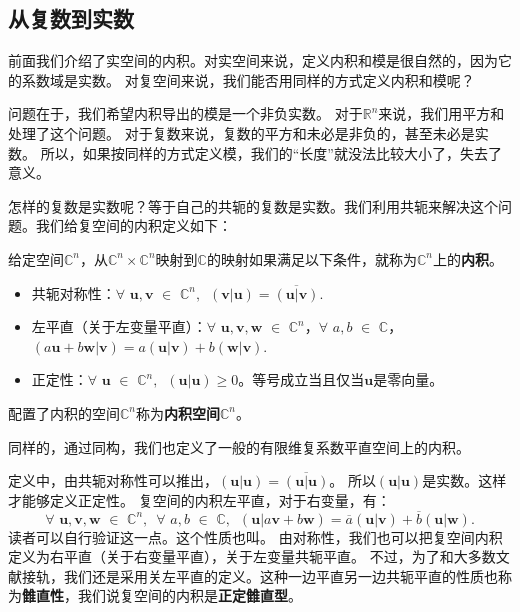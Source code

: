 \documentclass[12pt,UTF8,fontset=none]{ctexbook}
\begin{document}
\subsection{从复数到实数}
前面我们介绍了实空间的内积。对实空间来说，定义内积和模是很自然的，因为它的系数域是实数。
对复空间来说，我们能否用同样的方式定义内积和模呢？

问题在于，我们希望内积导出的模是一个非负实数。
对于$\mathbb{R}^n$来说，我们用平方和处理了这个问题。
对于复数来说，复数的平方和未必是非负的，甚至未必是实数。
所以，如果按同样的方式定义模，我们的“长度”就没法比较大小了，失去了意义。

怎样的复数是实数呢？等于自己的共轭的复数是实数。我们利用共轭来解决这个问题。我们给复空间的内积定义如下：
\begin{df}\label{df:7_3}
    给定空间$\mathbb{C}^n$，从$\mathbb{C}^n \times \mathbb{C}^n$映射到$\mathbb{C}$的映射如果满足以下条件，就称为$\mathbb{C}^n$上的\textbf{内积}。
    \begin{itemize}
        \item 共轭对称性：$\forall \,\, \mathbf{u}, \mathbf{v} \,\, \in \,\, \mathbb{C}^n, \,\,\, (\mathbf{v}|\mathbf{u}) = \overline{(\mathbf{u}|\mathbf{v})}.$
        \item 左平直（关于左变量平直）：$\forall \,\, \mathbf{u}, \mathbf{v}, \mathbf{w} \,\, \in \,\, \mathbb{C}^n$，$\forall \,\,a, b \,\, \in \,\, \mathbb{C}$，$ (a\mathbf{u}+b\mathbf{w}|\mathbf{v}) = a(\mathbf{u}|\mathbf{v}) + b(\mathbf{w}|\mathbf{v}).$
        \item 正定性：$\forall \,\, \mathbf{u} \,\, \in \,\, \mathbb{C}^n, \,\,\, (\mathbf{u}|\mathbf{u}) \geqslant 0$。等号成立当且仅当$\mathbf{u}$是零向量。
    \end{itemize}
    
    配置了内积的空间$\mathbb{C}^n$称为\textbf{内积空间}$\mathbb{C}^n$。
\end{df}
同样的，通过同构，我们也定义了一般的有限维复系数平直空间上的内积。

定义中，由共轭对称性可以推出，$(\mathbf{u}|\mathbf{u}) = \overline{(\mathbf{u}|\mathbf{u})}$。
所以$(\mathbf{u}|\mathbf{u})$是实数。这样才能够定义正定性。
复空间的内积左平直，对于右变量，有：
$$\forall \,\, \mathbf{u}, \mathbf{v}, \mathbf{w} \,\, \in \,\, \mathbb{C}^n, \,\,\, \forall \,\,a, b \,\, \in \,\, \mathbb{C}, \,\,\, (\mathbf{u}|a\mathbf{v}+b\mathbf{w}) = \overline{a}(\mathbf{u}|\mathbf{v}) + \overline{b}(\mathbf{u}|\mathbf{w}).$$
读者可以自行验证这一点。这个性质也叫。
由对称性，我们也可以把复空间内积定义为右平直（关于右变量平直），关于左变量共轭平直。
不过，为了和大多数文献接轨，我们还是采用关左平直的定义。这种一边平直另一边共轭平直的性质也称为\textbf{雔直性}，我们说复空间的内积是\textbf{正定雔直型}。
\end{document}
